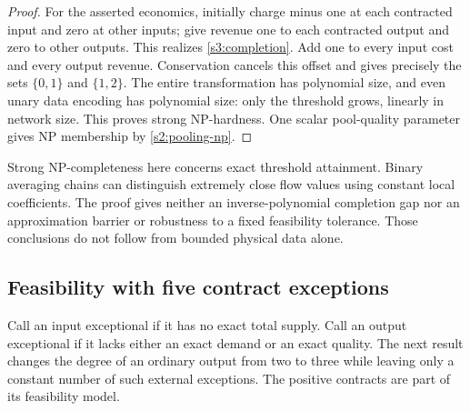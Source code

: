 \begin{proof}
For the asserted economics, initially charge minus one at each contracted
input and zero at other inputs; give revenue one to each contracted
output and zero to other outputs. This realizes \eqref{s3:completion}.
Add one to every input cost and every output revenue. Conservation
cancels this offset and gives precisely the sets $\{0,1\}$ and
$\{1,2\}$. The entire transformation has polynomial size, and even
unary data encoding has polynomial size: only the threshold grows,
linearly in network size. This proves strong NP-hardness. One scalar
pool-quality parameter gives NP membership by \cref{s2:pooling-np}.
\end{proof}

Strong NP-completeness here concerns exact threshold attainment. Binary
averaging chains can distinguish extremely close flow values using
constant local coefficients. The proof gives neither an inverse-polynomial
completion gap nor an approximation barrier or robustness to a fixed
feasibility tolerance. Those conclusions do not follow from bounded
physical data alone.

\subsection{Feasibility with five contract exceptions}\label{s3:five}

Call an input exceptional if it has no exact total supply. Call an output
exceptional if it lacks either an exact demand or an exact quality.
The next result changes the degree of an ordinary output from two to
three while leaving only a constant number of such external exceptions.
The positive contracts are part of its feasibility model.

